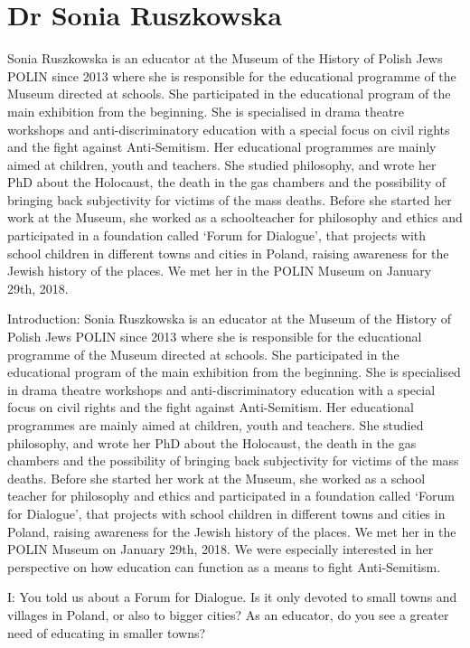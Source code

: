 \section{Dr Sonia Ruszkowska}

Sonia Ruszkowska is an educator at the Museum of the History of Polish Jews POLIN since 2013 where she is responsible for the educational programme of the Museum directed at schools. She participated in the educational program of the main exhibition from the beginning. She is specialised in drama theatre workshops and anti-discriminatory education with a special focus on civil rights and the fight against Anti-Semitism. Her educational programmes are mainly aimed at children, youth and teachers. She studied philosophy, and wrote her PhD about the Holocaust, the death in the gas chambers and the possibility of bringing back subjectivity for victims of the mass deaths. Before she started her work at the Museum, she worked as a schoolteacher for philosophy and ethics and participated in a foundation called ‘Forum for Dialogue’, that projects with school children in different towns and cities in Poland, raising awareness for the Jewish history of the places. We met her in the POLIN Museum on January 29th, 2018.  

Introduction: Sonia Ruszkowska is an educator at the Museum of the History of Polish Jews POLIN since 2013 where she is responsible for the educational programme of the Museum directed at schools. She participated in the educational program of the main exhibition from the beginning. She is specialised in drama theatre workshops and anti-discriminatory education with a special focus on civil rights and the fight against Anti-Semitism. Her educational programmes are mainly aimed at children, youth and teachers. 
She studied philosophy, and wrote her PhD about the Holocaust, the death in the gas chambers and the possibility of bringing back subjectivity for victims of the mass deaths. Before she started her work at the Museum, she worked as a school teacher for philosophy and ethics and participated in a foundation called ‘Forum for Dialogue’, that projects with school children in different towns and cities in Poland, raising awareness for the Jewish history of the places. 
We met her in the POLIN Museum on January 29th, 2018. We were especially interested in her perspective on how education can function as a means to fight Anti-Semitism. 

 

I: You told us about a Forum for Dialogue. Is it only devoted to small towns and villages in Poland, or also to bigger cities? As an educator, do you see a greater need of educating in smaller towns? 

